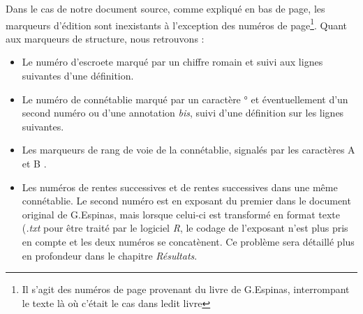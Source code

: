 Dans le cas de notre document source, comme expliqué en bas de page, les marqueurs d'édition sont inexistants à l'exception des numéros de page\footnote{ Il s'agit des numéros de page provenant du livre de G.Espinas, interrompant le texte là où c'était le cas dans ledit livre}. Quant aux marqueurs de structure, nous retrouvons :
\begin{itemize}
\item Le numéro d'escroete marqué par un chiffre romain et suivi aux lignes suivantes d'une définition.
\item Le numéro de connétablie marqué par un caractère \og ° \fg et éventuellement d'un second numéro ou d'une annotation \textit{bis}, suivi d'une définition sur les lignes suivantes.
\item Les marqueurs de rang de voie de la connétablie, signalés par les caractères \og A \fg et \og B \fg.
\item Les numéros de rentes successives et de rentes successives dans une même connétablie. Le second numéro est en exposant du premier dans le document original de G.Espinas, mais lorsque celui-ci est transformé en format texte (\textit{.txt} pour être traité par le logiciel \textit{R}, le codage de l'exposant n'est plus pris en compte et les deux numéros se concatènent. Ce problème sera détaillé plus en profondeur dans le chapitre \textit{Résultats}.  
\end{itemize}